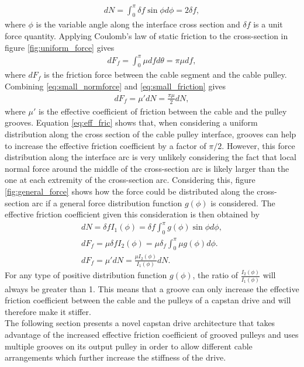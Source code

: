 \documentclass[twocolumn,10pt]{asme2ej}
\begin{document}
 \begin{align}
     dN = \int_0^\pi \delta f\sin{\phi}d\phi = 2\delta f,
     \label{eq:small_normforce}
 \end{align}
 where $\phi$ is the variable angle along the interface cross section and $\delta f$ is a unit force quantity. Applying Coulomb's law of static friction to the cross-section in figure \ref{fig:uniform_force} gives 
 \begin{align}
     dF_f = \int_0^\pi\mu df d\theta=\pi\mu df, \label{eq:small_friction}
 \end{align}
 where $dF_f$ is the friction force between the cable segment and the cable pulley. Combining  \eqref{eq:small_normforce} and \eqref{eq:small_friction} gives
 \begin{align}
     dF_f=\mu'dN=\frac{\pi\mu}{2}dN,\label{eq:eff_fric}
 \end{align}
 where $\mu'$ is the effective coefficient of friction between the cable and the pulley grooves. Equation \eqref{eq:eff_fric} shows that, when considering a uniform distribution along the cross section of the cable pulley interface, grooves can help to increase the effective friction coefficient by a factor of $\pi/2$. However, this force distribution along the interface arc is very unlikely considering the fact that local normal force around the middle of the cross-section arc is likely larger than the one at each extremity of the cross-section arc. Considering this, figure \ref{fig:general_force} shows how the force could be distributed along the cross-section arc if a general force distribution function $g(\phi)$ is considered. The effective friction coefficient given this consideration is then obtained by
 \begin{align}
     dN = \delta f I_1(\phi) = \delta f\int_0^{\pi}g(\phi)\sin\phi d\phi,\\
     dF_f = \mu\delta f I_2(\phi) = \mu\delta_f\int_0^\pi\mu g(\phi)d\phi.\\
     dF_f =\mu'dN= \frac{\mu I_2(\phi)}{I_1(\phi)}dN.
 \end{align}
 For any type of positive distribution function $g(\phi)$, the ratio of $\frac{I_2(\phi)}{I_1(\phi)}$ will always be greater than 1. This means that a groove can only increase the effective friction coefficient between the cable and the pulleys of a capstan drive and will therefore make it stiffer. 
\\ 
 The following section presents a novel capstan drive architecture that takes advantage of the increased effective friction coefficient of grooved pulleys and uses multiple grooves on its output pulley in order to allow different cable arrangements which further increase the stiffness of the drive.
\end{document}
